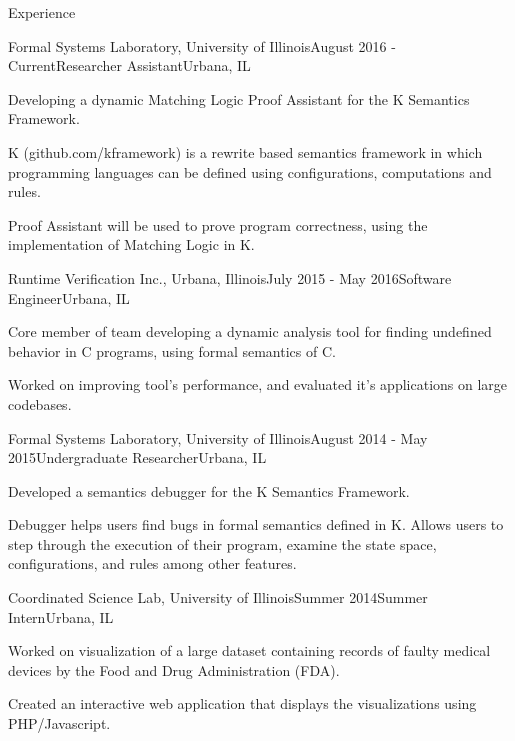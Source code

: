 \documentclass{resume} %
\begin{document}
\begin{rSection}{Experience}

\begin{rSubsection}{Formal Systems Laboratory, University of Illinois}{August 2016 - Current}{Researcher Assistant}{Urbana, IL}
\item Developing a dynamic Matching Logic Proof Assistant for the K Semantics Framework.
\item K (github.com/kframework) is a rewrite based semantics framework in which programming
languages can be defined using configurations, computations and rules.
\item Proof Assistant will be used to prove program correctness, using the implementation of Matching Logic in K.
\end{rSubsection}

\begin{rSubsection}{Runtime Verification Inc., Urbana, Illinois}{July 2015 - May 2016}{Software Engineer}{Urbana, IL}
\item Core member of team developing a dynamic analysis tool for finding undefined behavior in C programs, using formal semantics of C.
\item Worked on improving tool's performance, and evaluated it's applications on large codebases.
\end{rSubsection}

\begin{rSubsection}{Formal Systems Laboratory, University of Illinois}{August 2014 - May 2015}{Undergraduate Researcher}{Urbana, IL}
\item Developed a semantics debugger for the K Semantics Framework.
\item Debugger helps users find bugs in formal semantics defined in K. Allows users to step
through the execution of their program, examine the state space, configurations, and rules
among other features.
\end{rSubsection}


\begin{rSubsection}{Coordinated Science Lab, University of Illinois}{Summer 2014}{Summer Intern}{Urbana, IL}
\item Worked on visualization of a large dataset containing records of faulty medical devices by the Food and Drug Administration (FDA).
\item Created an interactive web application that displays the visualizations using PHP/Javascript.
\end{rSubsection}


\end{rSection}
\end{document}
